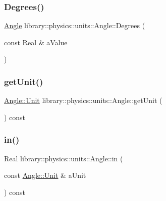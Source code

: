 \subsubsection{\texorpdfstring{Degrees()}{Degrees()}}
{\footnotesize\ttfamily \hyperlink{classlibrary_1_1physics_1_1units_1_1_angle}{Angle} library\+::physics\+::units\+::\+Angle\+::\+Degrees (\begin{DoxyParamCaption}\item[{const Real \&}]{a\+Value }\end{DoxyParamCaption})\hspace{0.3cm}{\ttfamily [static]}}

\mbox{\label{classlibrary_1_1physics_1_1units_1_1_angle_a44ca98d9a05643948f5d3bee79bcba63}} 
\subsubsection{\texorpdfstring{get\+Unit()}{getUnit()}}
{\footnotesize\ttfamily \hyperlink{classlibrary_1_1physics_1_1units_1_1_angle_a3c329d415a61783b16ce481874cc5956}{Angle\+::\+Unit} library\+::physics\+::units\+::\+Angle\+::get\+Unit (\begin{DoxyParamCaption}{ }\end{DoxyParamCaption}) const}

\mbox{\label{classlibrary_1_1physics_1_1units_1_1_angle_aa641b9b6dabfe5fa0b546a2d6492e5be}} 
\subsubsection{\texorpdfstring{in()}{in()}}
{\footnotesize\ttfamily Real library\+::physics\+::units\+::\+Angle\+::in (\begin{DoxyParamCaption}\item[{const \hyperlink{classlibrary_1_1physics_1_1units_1_1_angle_a3c329d415a61783b16ce481874cc5956}{Angle\+::\+Unit} \&}]{a\+Unit }\end{DoxyParamCaption}) const}

